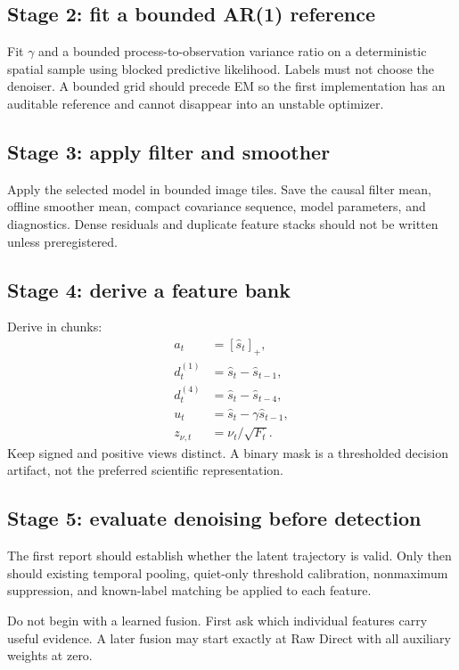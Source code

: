 \documentclass[11pt]{article}
\newcommand{\pos}[1]{\left[#1\right]_+}
\begin{document}
\subsection{Stage 2: fit a bounded AR(1) reference}

Fit \(\gamma\) and a bounded process-to-observation variance ratio on a
deterministic spatial sample using blocked predictive likelihood. Labels must
not choose the denoiser. A bounded grid should precede EM so the first
implementation has an auditable reference and cannot disappear into an
unstable optimizer.

\subsection{Stage 3: apply filter and smoother}

Apply the selected model in bounded image tiles. Save the causal filter mean,
offline smoother mean, compact covariance sequence, model parameters, and
diagnostics. Dense residuals and duplicate feature stacks should not be written
unless preregistered.

\subsection{Stage 4: derive a feature bank}

Derive in chunks:
\begin{align}
a_t &= \pos{\widehat s_t},\\
d_t^{(1)} &= \widehat s_t-\widehat s_{t-1},\\
d_t^{(4)} &= \widehat s_t-\widehat s_{t-4},\\
u_t &= \widehat s_t-\gamma\widehat s_{t-1},\\
z_{\nu,t} &= \nu_t/\sqrt{F_t}.
\end{align}
Keep signed and positive views distinct. A binary mask is a thresholded decision
artifact, not the preferred scientific representation.

\subsection{Stage 5: evaluate denoising before detection}

The first report should establish whether the latent trajectory is valid.
Only then should existing temporal pooling, quiet-only threshold calibration,
nonmaximum suppression, and known-label matching be applied to each feature.

Do not begin with a learned fusion. First ask which individual features carry
useful evidence. A later fusion may start exactly at Raw Direct with all
auxiliary weights at zero.
\end{document}
